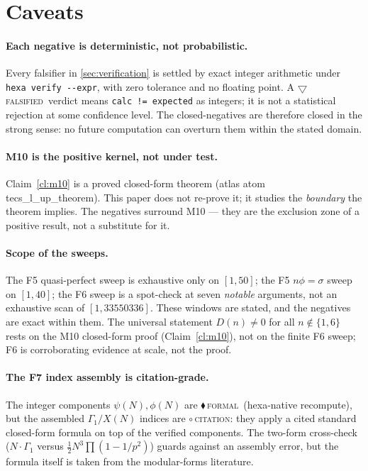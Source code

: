 \documentclass[11pt,a4paper]{article}
\newcommand{\sig}{\sigma}
\newcommand{\Dn}{D(n)}
\newcommand{\tierF}{\textcolor{blue!60!black}{$\blacklozenge$}\,\textsc{formal}}
\newcommand{\tierR}{\textcolor{red!70!black}{$\bigtriangledown$}\,\textsc{falsified}}
\newcommand{\tierC}{\textcolor{orange!85!black}{$\circ$}\,\textsc{citation}}
\theoremstyle{definition}
\begin{document}
\section{Caveats}
\label{sec:caveats}

\paragraph{Each negative is deterministic, not probabilistic.} Every falsifier
in \textsection\ref{sec:verification} is settled by exact integer arithmetic
under \texttt{hexa verify -{}-expr}, with zero tolerance and no floating point.
A \tierR\ verdict means \texttt{calc != expected} as integers; it is not a
statistical rejection at some confidence level. The closed-negatives are
therefore closed in the strong sense: no future computation can overturn them
within the stated domain.

\paragraph{M10 is the positive kernel, not under test.} Claim~\ref{cl:m10} is a
proved closed-form theorem (atlas atom \textsf{tecs\_l\_up\_theorem}). This paper
does not re-prove it; it studies the \emph{boundary} the theorem implies. The
negatives surround M10 --- they are the exclusion zone of a positive result, not
a substitute for it.

\paragraph{Scope of the sweeps.} The F5 quasi-perfect sweep is exhaustive only
on $[1,50]$; the F5 $n\phi=\sig$ sweep on $[1,40]$; the F6 sweep is a spot-check
at seven \emph{notable} arguments, not an exhaustive scan of $[1,33550336]$.
These windows are stated, and the negatives are exact within them. The universal
statement $\Dn\neq0$ for all $n\notin\{1,6\}$ rests on the M10 closed-form proof
(Claim~\ref{cl:m10}), not on the finite F6 sweep; F6 is corroborating evidence
at scale, not the proof.

\paragraph{The F7 index assembly is citation-grade.} The integer components
$\psi(N),\phi(N)$ are \tierF\ (hexa-native recompute), but the assembled
$\Gamma_1/X(N)$ indices are \tierC: they apply a cited standard closed-form
formula on top of the verified components. The two-form cross-check
($N\cdot\Gamma_1$ versus $\tfrac12N^3\prod(1-1/p^2)$) guards against an assembly
error, but the formula itself is taken from the modular-forms literature.
\end{document}
